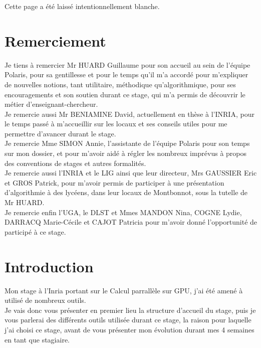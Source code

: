 \documentclass[a4paper,12pt]{article}
\begin{document}
	\newpage
	{\scriptsize Cette page a \'e{}t\'e{} laiss\'e{} intentionnellement blanche.
	\newpage
	\renewcommand{\contentsname}{
		\begin{center}
			Sommaire
		\end{center}
	}
	\setcounter{tocdepth}{3}
	\tableofcontents
	\newpage
	\section{Remerciement}
		\indent Je tiens à remercier Mr HUARD Guillaume pour son accueil au sein de l'équipe Polaris, pour sa gentillesse et pour le temps qu'il m'a accord\'e{} pour m'expliquer de nouvelles notions, tant utilitaire, m\'e{}thodique qu'algorithmique, pour ses encouragements et son soutien durant ce stage, qui m'a permis de d\'e{}couvrir le m\'e{}tier d'enseignant-chercheur. \\
		\indent Je remercie aussi Mr BENIAMINE David, actuellement en th\`ese à l'INRIA, pour le temps pass\'e{} à m’accueillir sur les locaux et ses conseils utiles pour me permettre d'avancer durant le stage.\\
		\indent Je remercie Mme SIMON Annie, l'assistante de l'\'e{}quipe Polaris pour son temps sur mon dossier, et pour m'avoir aid\'e{} à r\'e{}gler les nombreux impr\'e{}vus à propos des conventions de stages et autres formalit\'e{}s.\\
		\indent Je remercie aussi l'INRIA et le LIG ainsi que leur directeur, Mrs GAUSSIER Eric et GROS Patrick, pour m'avoir permis de participer à une pr\'e{}sentation d'algorithmie à des lycéens, dans leur locaux de Montbonnot, sous la tutelle de Mr HUARD.\\
		\indent Je remercie enfin l'UGA, le DLST et Mmes MANDON Nina, COGNE Lydie, DARRACQ Marie-Cécile et CAJOT Patricia pour m'avoir donné l'opportunité de participé à ce stage.
	\newpage
	\section{Introduction}
	\indent Mon stage à l'Inria portant sur le Calcul parrallèle sur GPU, j'ai été amené à utilisé de nombreux outils.\\
	\noindent Je vais donc vous présenter en premier lieu la structure d'accueil du stage, puis je vous parlerai des différents outils utilisée durant ce stage, la raison pour laquelle j'ai choisi ce stage, avant de vous présenter mon évolution durant mes 4 semaines en tant que stagiaire.
}
\end{document}
